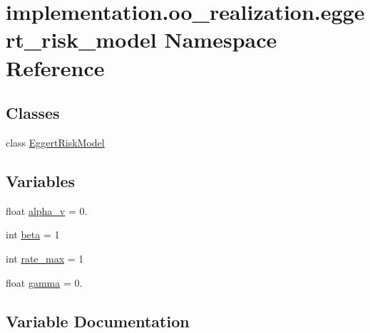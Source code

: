 \hypertarget{namespaceimplementation_1_1oo__realization_1_1eggert__risk__model}{}\section{implementation.\+oo\+\_\+realization.\+eggert\+\_\+risk\+\_\+model Namespace Reference}
\label{namespaceimplementation_1_1oo__realization_1_1eggert__risk__model}
\subsection*{Classes}
\begin{DoxyCompactItemize}
\item 
class \hyperlink{classimplementation_1_1oo__realization_1_1eggert__risk__model_1_1_eggert_risk_model}{Eggert\+Risk\+Model}
\end{DoxyCompactItemize}
\subsection*{Variables}
\begin{DoxyCompactItemize}
\item 
float \hyperlink{namespaceimplementation_1_1oo__realization_1_1eggert__risk__model_a19c874b3ffe157a50150739a2c7c326f}{alpha\+\_\+v} = 0.
\item 
int \hyperlink{namespaceimplementation_1_1oo__realization_1_1eggert__risk__model_a9bd3742eae2f00c3a96ae069a471f367}{beta} = 1
\item 
int \hyperlink{namespaceimplementation_1_1oo__realization_1_1eggert__risk__model_a744a01e8f87d14e48dee037a00305463}{rate\+\_\+max} = 1
\item 
float \hyperlink{namespaceimplementation_1_1oo__realization_1_1eggert__risk__model_ae8f8d0c95f284dd99ad89136e6bc65db}{gamma} = 0.
\end{DoxyCompactItemize}


\subsection{Variable Documentation}
\mbox{\label{namespaceimplementation_1_1oo__realization_1_1eggert__risk__model_a19c874b3ffe157a50150739a2c7c326f}} 
